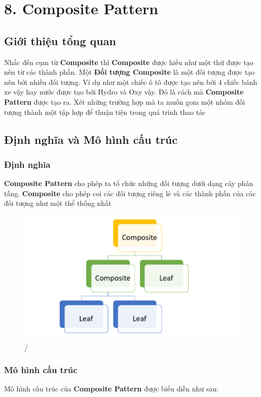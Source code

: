 \chapter{8. Composite Pattern}
\section{Giới thiệu tổng quan}

Nhắc đến cụm từ \textbf{Composite} thì \textbf{Composite} được hiểu như một thứ được tạo nên từ các thành phần. Một \textbf{Đối tượng Composite} là một đối tượng được tạo nên bởi nhiều đối tượng. Ví dụ như một chiếc ô tô được tạo nên bởi 4 chiếc bánh xe vậy hay nước được tạo bởi Hydro và Oxy vậy. Đó là cách mà \textbf{Composite Pattern} được tạo ra. Xét những trường hợp mà ta muốn gom một nhóm đối tượng thành một tập hợp để thuận tiện trong quá trình thao tác

\section{Định nghĩa và Mô hình cấu trúc}
\subsection{Định nghĩa}
\textbf{Composite Pattern} cho phép ta tổ chức những đối tượng dưới dạng cây phân tầng. \textbf{Composite} cho phép coi các đối tượng riêng lẻ và các thành phần của các đối tượng như một thể thống nhất

\begin{figure}[!htb]
    \centering
    \includegraphics[width=\textwidth]{fig/Composite/CompositeStructure.png}/
\end{figure}
\newpage
\subsection{Mô hình cấu trúc}
Mô hình cấu trúc của \textbf{Composite Pattern} được biểu diễn như sau:

